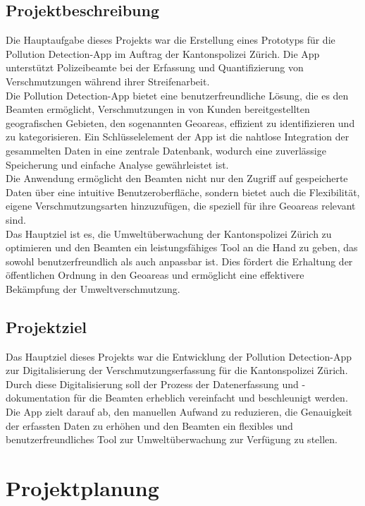 \documentclass[a4paper,12pt]{article}
\begin{document}
\subsection{Projektbeschreibung}
\label{sec:projektbeschreibung}
Die Hauptaufgabe dieses Projekts war die Erstellung eines Prototyps für die \glqq Pollution Detection\grqq{}-App im Auftrag der Kantonspolizei Zürich. Die App unterstützt Polizeibeamte bei der Erfassung und Quantifizierung von Verschmutzungen während ihrer Streifenarbeit.\\
Die \glqq Pollution Detection\grqq{}-App bietet eine benutzerfreundliche Lösung, die es den Beamten ermöglicht, Verschmutzungen in von Kunden bereitgestellten geografischen Gebieten, den sogenannten Geoareas, effizient zu identifizieren und zu kategorisieren. Ein Schlüsselelement der App ist die nahtlose Integration der gesammelten Daten in eine zentrale Datenbank, wodurch eine zuverlässige Speicherung und einfache Analyse gewährleistet ist.\\
Die Anwendung ermöglicht den Beamten nicht nur den Zugriff auf gespeicherte Daten über eine intuitive Benutzeroberfläche, sondern bietet auch die Flexibilität, eigene Verschmutzungsarten hinzuzufügen, die speziell für ihre Geoareas relevant sind.\\
Das Hauptziel ist es, die Umweltüberwachung der Kantonspolizei Zürich zu optimieren und den Beamten ein leistungsfähiges Tool an die Hand zu geben, das sowohl benutzerfreundlich als auch anpassbar ist. Dies fördert die Erhaltung der öffentlichen Ordnung in den Geoareas und ermöglicht eine effektivere Bekämpfung der Umweltverschmutzung.

\subsection{Projektziel}
Das Hauptziel dieses Projekts war die Entwicklung der \glqq Pollution Detection\grqq{}-App zur Digitalisierung der Verschmutzungserfassung für die Kantonspolizei Zürich. Durch diese Digitalisierung soll der Prozess der Datenerfassung und -dokumentation für die Beamten erheblich vereinfacht und beschleunigt werden. Die App zielt darauf ab, den manuellen Aufwand zu reduzieren, die Genauigkeit der erfassten Daten zu erhöhen und den Beamten ein flexibles und benutzerfreundliches Tool zur Umweltüberwachung zur Verfügung zu stellen.

\section{Projektplanung}
\end{document}
